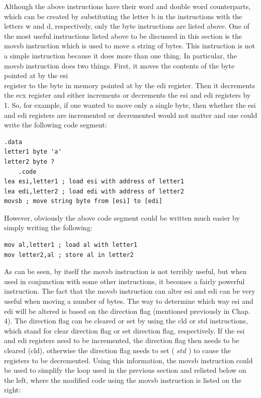 \documentclass[10pt]{article}
\begin{document}
Although the above instructions have their word and double word counterparts, which can be created by substituting the letter b in the instructions with the letters w and d, respectively, only the byte instructions are listed above. One of the most useful instructions listed above to be discussed in this section is the movsb instruction which is used to move a string of bytes. This instruction is not a simple instruction because it does more than one thing. In particular, the movsb instruction does two things. First, it moves the contents of the byte pointed at by the esi\\
register to the byte in memory pointed at by the edi register. Then it decrements the ecx register and either increments or decrements the esi and edi registers by 1. So, for example, if one wanted to move only a single byte, then whether the esi and edi registers are incremented or decremented would not matter and one could write the following code segment:

\begin{verbatim}
.data
letter1 byte 'a'
letter2 byte ?
    .code
lea esi,letter1 ; load esi with address of letter1
lea edi,letter2 ; load edi with address of letter2
movsb ; move string byte from [esi] to [edi]
\end{verbatim}

However, obviously the above code segment could be written much easier by simply writing the following:

\begin{verbatim}
mov al,letter1 ; load al with letter1
mov letter2,al ; store al in letter2
\end{verbatim}

As can be seen, by itself the movsb instruction is not terribly useful, but when used in conjunction with some other instructions, it becomes a fairly powerful instruction. The fact that the movsb instruction can alter esi and edi can be very useful when moving a number of bytes. The way to determine which way esi and edi will be altered is based on the direction flag (mentioned previously in Chap. 4). The direction flag can be cleared or set by using the cld or std instructions, which stand for clear direction flag or set direction flag, respectively. If the esi and edi registers need to be incremented, the direction flag then needs to be cleared (cld), otherwise the direction flag needs to set ( $s t d$ ) to cause the registers to be decremented. Using this information, the movsb instruction could be used to simplify the loop used in the previous section and relisted below on the left, where the modified code using the movsb instruction is listed on the right:
\end{document}
